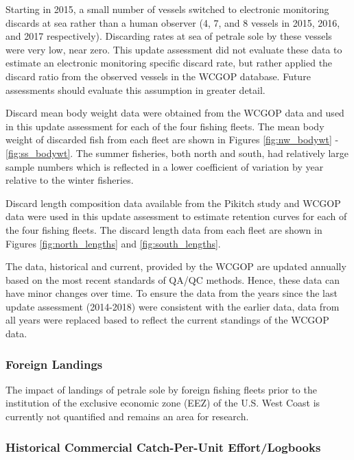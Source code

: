 \documentclass[12pt,]{article}
\begin{document}
Starting in 2015, a small number of vessels switched to electronic
monitoring discards at sea rather than a human observer (4, 7, and 8
vessels in 2015, 2016, and 2017 respectively). Discarding rates at sea
of petrale sole by these vessels were very low, near zero. This update
assessment did not evaluate these data to estimate an electronic
monitoring specific discard rate, but rather applied the discard ratio
from the observed vessels in the WCGOP database. Future assessments
should evaluate this assumption in greater detail.

Discard mean body weight data were obtained from the WCGOP data and used
in this update assessment for each of the four fishing fleets. The mean
body weight of discarded fish from each fleet are shown in Figures
\ref{fig:nw_bodywt} - \ref{fig:ss_bodywt}. The summer fisheries, both
north and south, had relatively large sample numbers which is reflected
in a lower coefficient of variation by year relative to the winter
fisheries.

Discard length composition data available from the Pikitch study and
WCGOP data were used in this update assessment to estimate retention
curves for each of the four fishing fleets. The discard length data from
each fleet are shown in Figures \ref{fig:north_lengths} and
\ref{fig:south_lengths}.

The data, historical and current, provided by the WCGOP are updated
annually based on the most recent standards of QA/QC methods. Hence,
these data can have minor changes over time. To ensure the data from the
years since the last update assessment (2014-2018) were consistent with
the earlier data, data from all years were replaced based to reflect the
current standings of the WCGOP data.

\subsubsection{Foreign Landings}\label{foreign-landings}

The impact of landings of petrale sole by foreign fishing fleets prior
to the institution of the exclusive economic zone (EEZ) of the U.S. West
Coast is currently not quantified and remains an area for research.

\subsubsection{Historical Commercial Catch-Per-Unit
Effort/Logbooks}\label{historical-commercial-catch-per-unit-effortlogbooks}
\end{document}
